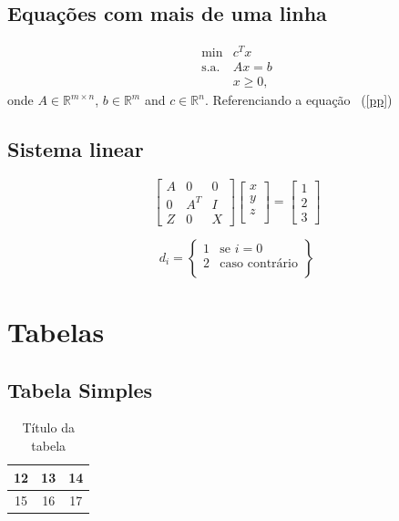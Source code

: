 \documentclass[12pt,fleqn]{article}
\newcommand{\Rn}{{\ensuremath{\mathbb{R}}}^{n}}
\newcommand{\Rm}{{\ensuremath{\mathbb{R}}}^{m}}
\newcommand{\Rmn}{{\ensuremath{\mathbb{R}}}^{{m}\times{n}}}
\begin{document}
\subsection{Equações com mais de uma linha}
\begin{eqnarray}
\label{pp} %
\min & c^Tx \\ \nonumber
\mbox{s.a.} & Ax=b \\ \nonumber
            & x \geq 0, \nonumber
\end{eqnarray}
onde $A \in \Rmn$, $b \in \Rm$ and $c \in \Rn$.
Referenciando a equação ~(\ref{pp})

\subsection{Sistema linear}

\begin{equation}
 \left[
\begin{array}{ccc}
 A & 0   & 0 \\
 0 & A^T & I\\
 Z & 0   & X
\end{array} \right]
\left[
\begin{array}{c}
 x \\
 y \\
 z \\
\end{array}
\right]
=
\left[
\begin{array}{c}
 1 \\
 2 \\
 3
\end{array}
\right]
\label{eqpc0}
\end{equation}

\[
d_i=\left \{
\begin{array}{cc}
1 & \mbox{se } i=0 \\
2 & \mbox{caso contrário}\\
\end{array}
\right \}
\]

\clearpage

\section{Tabelas}
\label{sec:tab}


\subsection{Tabela Simples}
\begin{table}[htb]
\begin{center}
		\begin{tabular}{|c|c|c|}\hline
		12  & 13 & 14 \\\hline
		15  & 16 & 17 \\\hline
		\end{tabular}
\label{tab:Tabela1}
\caption{Título da tabela}
\end{center}
\end{table}
\end{document}

